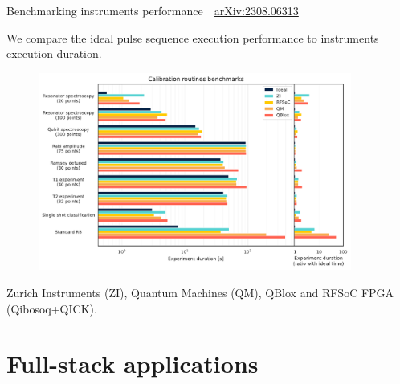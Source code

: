 \documentclass[aspectratio=169, 8pt, xcolor={svgnames}, hyperref={linkcolor=black}]{beamer}
\begin{document}
 \begin{frame}{Benchmarking instruments performance \hfill \faBook\,\, \href{https://arxiv.org/abs/2308.06313}{arXiv:2308.06313}}

   We compare the ideal pulse sequence execution performance to instruments execution duration.
   \vspace{-0.5cm}
   \begin{figure}
     \includegraphics[height=6.5cm]{figures/routines.pdf}
   \end{figure}
   \vspace{-0.5cm}
   \begin{center}
     \small
     Zurich Instruments (ZI), Quantum Machines
     (QM), QBlox and RFSoC FPGA (Qibosoq+QICK).
   \end{center}

 \end{frame}

\section{Full-stack applications}
\end{document}
